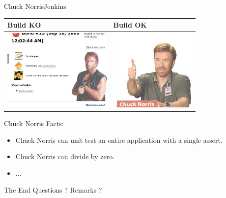 \documentclass[9pt]{beamer}
\begin{document}
\begin{frame}{Chuck Norris}{Jenkins}
  \begin{center}
    \begin{tabular}{ l |l }
      Build KO & Build OK \\ \hline
        \includegraphics[height=4cm]{images/chuck_full} &
      \includegraphics[height=4cm]{images/chuck_happy}
      \\
    \end{tabular}
  \end{center}
  Chuck Norris Facts:
  \begin{itemize}
    \item Chuck Norris can unit test an entire application with a single assert.
    \item Chuck Norris can divide by zero.
    \item ...
  \end{itemize}
\end{frame}



\begin{frame}{The End}
  Questions ?  Remarks ?
\end{frame}
\end{document}
